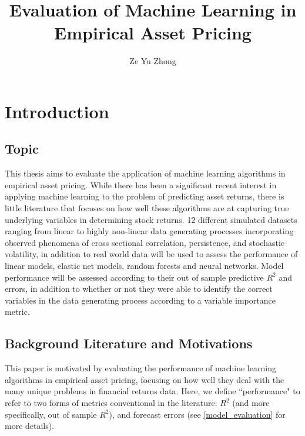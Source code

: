 \documentclass[a4paper, table]{article}
\title{Evaluation of Machine Learning in Empirical Asset Pricing}
\author{Ze Yu Zhong}
\begin{document}
\maketitle

\tableofcontents

\section{Introduction}

\subsection{Topic}

This thesis aims to evaluate the application of machine learning algorithms in empirical asset pricing. While there has been a significant recent interest in applying machine learning to the problem of predicting asset returns, there is little literature that focuses on how well these algorithms are at capturing true underlying variables in determining stock returns. 12 different simulated datasets ranging from linear to highly non-linear data generating processes incorporating observed phenomena of cross sectional correlation, persistence, and stochastic volatility, in addition to real world data will be used to assess the performance of linear models, elastic net models, random forests and neural networks. Model performance will be assessed according to their out of sample predictive $R^2$ and errors, in addition to whether or not they were able to identify the correct variables in the data generating process according to a variable importance metric.

\subsection{Background Literature and Motivations}

This paper is motivated by evaluating the performance of machine learning algorithms in empirical asset pricing, focusing on how well they deal with the many unique problems in financial returns data. Here, we define ``performance" to refer to two forms of metrics conventional in the literature: $R^2$ (and more specifically, out of sample $R^2$), and forecast errors (see \ref{model_evaluation} for more details).
\end{document}
